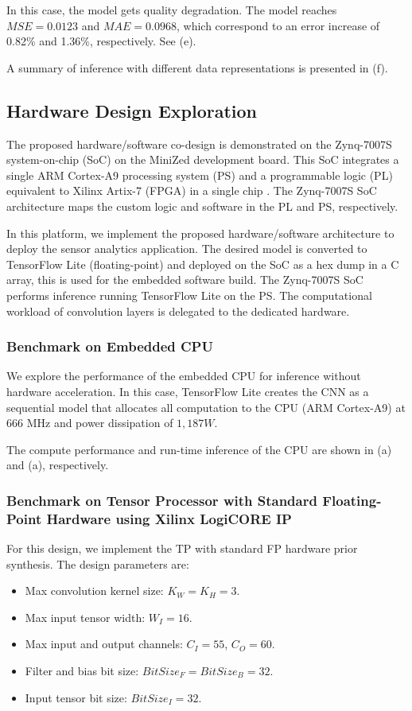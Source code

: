 In this case, the model gets quality degradation. The model reaches $MSE=0.0123$ and $MAE=0.0968$, which correspond to an error increase of 0.82\% and 1.36\%, respectively. See (e).

A summary of inference with different data representations is presented in (f).

\subsection{Hardware Design Exploration}
The proposed hardware/software co-design is demonstrated on the Zynq-7007S system-on-chip (SoC) on the MiniZed development board. This SoC integrates a single ARM Cortex-A9 processing system (PS) and a programmable logic (PL) equivalent to Xilinx Artix-7 (FPGA) in a single chip \cite{xilinx2015zynq}. The Zynq-7007S SoC architecture maps the custom logic and software in the PL and PS, respectively.

In this platform, we implement the proposed hardware/software architecture to deploy the sensor analytics application. The desired model is converted to TensorFlow Lite (floating-point) and deployed on the SoC as a hex dump in a C array, this is used for the embedded software build. The Zynq-7007S SoC performs inference running TensorFlow Lite on the PS. The computational workload of convolution layers is delegated to the dedicated hardware.

\subsubsection{Benchmark on Embedded CPU}
We explore the performance of the embedded CPU for inference without hardware acceleration. In this case, TensorFlow Lite creates the CNN as a sequential model that allocates all computation to the CPU (ARM Cortex-A9) at 666 MHz and power dissipation of $1,187 W$.

The compute performance and run-time inference of the CPU are shown in (a) and (a), respectively.

\subsubsection{Benchmark on Tensor Processor with Standard Floating-Point Hardware using Xilinx LogiCORE IP}
For this design, we implement the TP with standard FP hardware prior synthesis. The design parameters are:
\begin{itemize}
	\item Max convolution kernel size: $K_W = K_H = 3$.
	\item Max input tensor width: $W_I = 16$.
	\item Max input and output channels: $C_I = 55$, $C_O = 60$.
	\item Filter and bias bit size: $BitSize_F=BitSize_B=32$.
	\item Input tensor bit size: $BitSize_I=32$.
\end{itemize}

